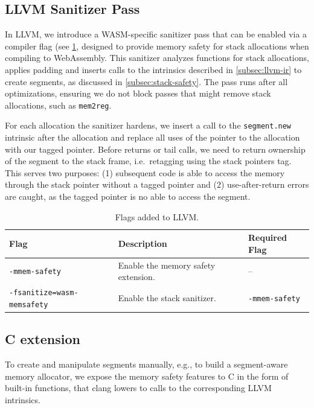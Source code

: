 \subsection{LLVM Sanitizer Pass}
\label{subsec:llvm-sanitizer-pass}

In LLVM, we introduce a \ac{WASM}-specific sanitizer pass that can be enabled via a compiler flag (see \cref{tab:llvm-flags}, designed to provide memory safety for stack allocations when compiling to WebAssembly.
This sanitizer analyzes functions for stack allocations, applies padding and inserts calls to the intrinsics described in \cref{subsec:llvm-ir} to create segments, as discussed in \cref{subsec:stack-safety}.
The pass runs after all optimizations, ensuring we do not block passes that might remove stack allocations, such as \texttt{mem2reg}.

For each allocation the sanitizer hardens, we insert a call to the \texttt{segment.new} intrinsic after the allocation and replace all uses of the pointer to the allocation with our tagged pointer.
Before returns or tail calls, we need to return ownership of the segment to the stack frame, i.e.\ retagging using the stack pointers tag.
This serves two purposes: (1) subsequent code is able to access the memory through the stack pointer without a tagged pointer and (2) use-after-return errors are caught, as the tagged pointer is no able to access the segment.

\begin{table}[t]
  \centering
  \begin{tabular}{l | l | l}
    \textbf{Flag} & \textbf{Description} & \textbf{Required Flag} \\
    \hline
    \texttt{-mmem-safety}              & Enable the memory safety extension. & -- \\
    \texttt{-fsanitize=wasm-memsafety} & Enable the stack sanitizer. & \texttt{-mmem-safety} \\
  \end{tabular}
  \caption{Flags added to LLVM.}
  \label{tab:llvm-flags}
\end{table}

\subsection{C extension}
\label{subsec:c-extension}

To create and manipulate segments manually, e.g., to build a segment-aware memory allocator, we expose the memory safety features to C in the form of built-in functions, that clang lowers to calls to the corresponding LLVM intrinsics.

